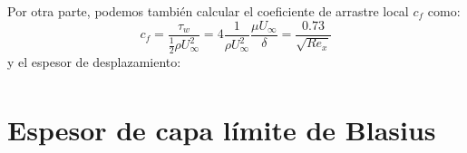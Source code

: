 Por otra parte, podemos también calcular el coeficiente de arrastre local $c_f$ como:
%
\begin{equation}
c_f = \frac{\tau_w}{\frac{1}{2}\rho U_\infty^2} = 4\frac{1}{\rho U_\infty^2}\frac{\mu U_\infty}{\delta} = \frac{0.73}{\sqrt{Re_x}}
\end{equation}
%
y el espesor de desplazamiento:
%
\begin{align}

\end{align}
\section*{Espesor de capa límite de Blasius}


